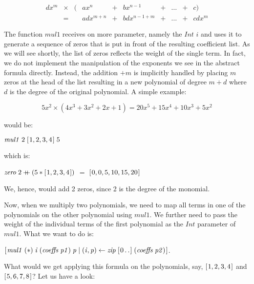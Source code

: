 \documentclass[tikz]{scrreprt}
\newcommand{\Conid}[1]{\mathit{#1}}
\newcommand{\Varid}[1]{\mathit{#1}}
\newcommand{\plus}{\mathbin{+\!\!\!+}}
\begin{document}
\begin{equation}
\begin{array}{lcrlclcccl}
dx^m & \times & ( & ax^n      & + & bx^{n-1}    & + & \dots & + & c)\\
     & =      &   & adx^{m+n} & + & bdx^{n-1+m} & + & \dots & + & cdx^m
\end{array}
\end{equation}

The function \ensuremath{\Varid{mul1}} receives on more parameter,
namely the \ensuremath{\Conid{Int}} $i$ and uses it to generate a sequence of zeros
that is put in front of the resulting coefficient list.
As we will see shortly, the list of zeros reflects the weight
of the single term. In fact, we do not implement the manipulation
of the exponents we see in the abstract formula directly.
Instead, the addition $+m$ is implicitly handled by placing
$m$ zeros at the head of the list resulting in a new polynomial
of degree $m+d$ where $d$ is the degree of the original polynomial.
A simple example:

\[
5x^2 \times (4x^3 + 3x^2 + 2x + 1) = 20x^5 + 15x^4 + 10x^3 + 5x^2
\]

would be:

\ensuremath{\Varid{mul1}\;\mathrm{2}\;[\mskip1.5mu \mathrm{1},\mathrm{2},\mathrm{3},\mathrm{4}\mskip1.5mu]\;\mathrm{5}}

which is: 

\ensuremath{\Varid{zero}\;\mathrm{2}\plus (\mathrm{5}\mathbin{*}[\mskip1.5mu \mathrm{1},\mathrm{2},\mathrm{3},\mathrm{4}\mskip1.5mu])} $=$ \ensuremath{[\mskip1.5mu \mathrm{0},\mathrm{0},\mathrm{5},\mathrm{10},\mathrm{15},\mathrm{20}\mskip1.5mu]}

We, hence, would add 2 zeros, since 2 is the degree
of the monomial.

Now, when we multiply two polynomials, we need to map
all terms in one of the polynomials on the other polynomial
using \ensuremath{\Varid{mul1}}. We further need to pass the weight of
the individual terms of the first polynomial as the \ensuremath{\Conid{Int}}
parameter of \ensuremath{\Varid{mul1}}. What we want to do is:

\ensuremath{[\mskip1.5mu \Varid{mul1}\;(\mathbin{*})\;\Varid{i}\;(\Varid{coeffs}\;\Varid{p1})\;\Varid{p}\mid (\Varid{i},\Varid{p})\leftarrow \Varid{zip}\;[\mskip1.5mu \mathrm{0}\mathinner{\ldotp\ldotp}\mskip1.5mu]\;(\Varid{coeffs}\;\Varid{p2})\mskip1.5mu]}.

What would we get applying this formula on
the polynomials, say, 
\ensuremath{[\mskip1.5mu \mathrm{1},\mathrm{2},\mathrm{3},\mathrm{4}\mskip1.5mu]} and \ensuremath{[\mskip1.5mu \mathrm{5},\mathrm{6},\mathrm{7},\mathrm{8}\mskip1.5mu]}?
Let us have a look:
\end{document}
